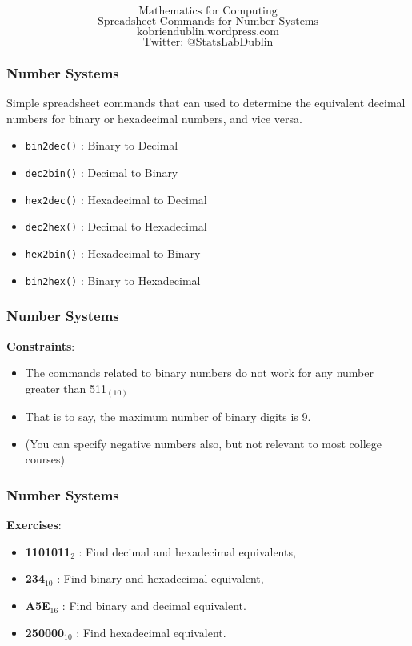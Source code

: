 \documentclass{beamer}
\begin{document}
\begin{frame}

{
\Huge
\[\mbox{Mathematics for Computing}\]
\LARGE
\[\mbox{Spreadsheet Commands for Number Systems}\]
}
{
\Large
\[\mbox{kobriendublin.wordpress.com}\]
\[\mbox{Twitter: @StatsLabDublin}\]
}
\end{frame}
\begin{frame}
\frametitle{Number Systems}

\Large
Simple spreadsheet commands that can used to determine the equivalent decimal numbers for binary or hexadecimal numbers, and vice versa.


\bigskip
\begin{itemize}
\item \texttt{bin2dec()} : Binary to Decimal 
\item \texttt{dec2bin()} : Decimal to Binary 
\item \texttt{hex2dec()} : Hexadecimal to Decimal 
\item \texttt{dec2hex()} : Decimal to Hexadecimal
\item \texttt{hex2bin()} : Hexadecimal to Binary 
\item \texttt{bin2hex()} : Binary to Hexadecimal
\end{itemize}

 \end{frame}
 \begin{frame}
 \frametitle{Number Systems}
 \Large
 \textbf{Constraints}:
 \begin{itemize}
 \item The commands related to binary numbers do not work for any number greater than 511$_{(10)}$
 \item That is to say, the maximum number of binary digits is 9.
 \item (You can specify negative numbers also, but not relevant to most college courses)
 \end{itemize}

\end{frame}
\begin{frame}
\frametitle{Number Systems}
\Large
\textbf{Exercises}:
\begin{itemize}
\item \textbf{1101011}$_{2}$ :  Find decimal and hexadecimal equivalents,
\item \textbf{234}$_{10}$ : Find binary and hexadecimal equivalent,
\item \textbf{A5E}$_{16}$ : Find binary and decimal equivalent.
\item \textbf{250000}$_{10}$ : Find hexadecimal equivalent.
\end{itemize}
\end{frame}
\end{document}
